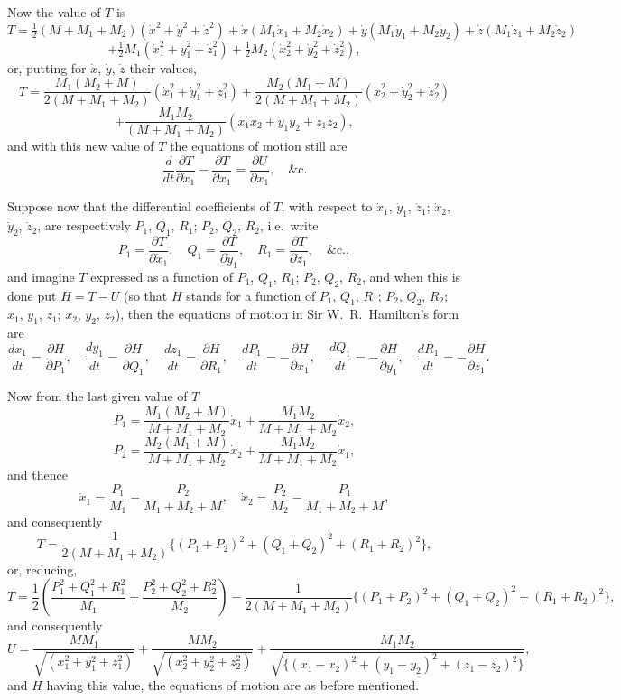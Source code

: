 \documentclass[12pt,a4paper]{article}
\theoremstyle{plain}
\theoremstyle{definition}
\begin{document}
Now the value of $T$ is
\[
T = \tfrac{1}{2}(M + M_1 + M_2)(\dot{x}^2 + \dot{y}^2 + \dot{z}^2) + \dot{x}(M_1\dot{x}_1 + M_2\dot{x}_2) + \dot{y}(M_1\dot{y}_1 + M_2\dot{y}_2) + \dot{z}(M_1\dot{z}_1 + M_2\dot{z}_2)
\]
\[
+ \tfrac{1}{2}M_1(\dot{x}_1^2 + \dot{y}_1^2 + \dot{z}_1^2) + \tfrac{1}{2}M_2(\dot{x}_2^2 + \dot{y}_2^2 + \dot{z}_2^2),
\]
or, putting for $\dot{x}$, $\dot{y}$, $\dot{z}$ their values,
\[
T = \frac{M_1(M_2 + M)}{2(M + M_1 + M_2)}(\dot{x}_1^2 + \dot{y}_1^2 + \dot{z}_1^2) + \frac{M_2(M_1 + M)}{2(M + M_1 + M_2)}(\dot{x}_2^2 + \dot{y}_2^2 + \dot{z}_2^2)
\]
\[
+ \frac{M_1M_2}{(M + M_1 + M_2)}(\dot{x}_1\dot{x}_2 + \dot{y}_1\dot{y}_2 + \dot{z}_1\dot{z}_2),
\]
and with this new value of $T$ the equations of motion still are
\[
\frac{d}{dt} \frac{\partial T}{\partial \dot{x}_1} - \frac{\partial T}{\partial x_1} = \frac{\partial U}{\partial x_1}, \quad \&\text{c.}
\]

\newpage
[181]

Suppose now that the differential coefficients of $T$, with respect to $\dot{x}_1$, $\dot{y}_1$, $\dot{z}_1$; $\dot{x}_2$, $\dot{y}_2$, $\dot{z}_2$, are respectively $P_1$, $Q_1$, $R_1$; $P_2$, $Q_2$, $R_2$, i.e.\ write
\[
P_1 = \frac{\partial T}{\partial \dot{x}_1}, \quad Q_1 = \frac{\partial T}{\partial \dot{y}_1}, \quad R_1 = \frac{\partial T}{\partial \dot{z}_1}, \quad \&\text{c.},
\]
and imagine $T$ expressed as a function of $P_1$, $Q_1$, $R_1$; $P_2$, $Q_2$, $R_2$, and when this is done put $H = T - U$ (so that $H$ stands for a function of $P_1$, $Q_1$, $R_1$; $P_2$, $Q_2$, $R_2$; $x_1$, $y_1$, $z_1$; $x_2$, $y_2$, $z_2$), then the equations of motion in Sir W.~R.~Hamilton's form are
\[
\frac{dx_1}{dt} = \frac{\partial H}{\partial P_1}, \quad
\frac{dy_1}{dt} = \frac{\partial H}{\partial Q_1}, \quad
\frac{dz_1}{dt} = \frac{\partial H}{\partial R_1}, \quad
\frac{dP_1}{dt} = -\frac{\partial H}{\partial x_1}, \quad
\frac{dQ_1}{dt} = -\frac{\partial H}{\partial y_1}, \quad
\frac{dR_1}{dt} = -\frac{\partial H}{\partial z_1}.
\]

Now from the last given value of $T$
\[
P_1 = \frac{M_1(M_2 + M)}{M + M_1 + M_2}\dot{x}_1 + \frac{M_1M_2}{M + M_1 + M_2}\dot{x}_2,
\]
\[
P_2 = \frac{M_2(M_1 + M)}{M + M_1 + M_2}\dot{x}_2 + \frac{M_1M_2}{M + M_1 + M_2}\dot{x}_1,
\]
and thence
\[
\dot{x}_1 = \frac{P_1}{M_1} - \frac{P_2}{M_1 + M_2 + M}, \quad
\dot{x}_2 = \frac{P_2}{M_2} - \frac{P_1}{M_1 + M_2 + M},
\]
and consequently
\[
T = \frac{1}{2(M + M_1 + M_2)}\{(P_1 + P_2)^2 + (Q_1 + Q_2)^2 + (R_1 + R_2)^2\},
\]
or, reducing,
\[
T = \frac{1}{2}\left(\frac{P_1^2 + Q_1^2 + R_1^2}{M_1} + \frac{P_2^2 + Q_2^2 + R_2^2}{M_2}\right) - \frac{1}{2(M + M_1 + M_2)}\{(P_1 + P_2)^2 + (Q_1 + Q_2)^2 + (R_1 + R_2)^2\},
\]
and consequently
\[
U = \frac{MM_1}{\sqrt{(x_1^2 + y_1^2 + z_1^2)}} + \frac{MM_2}{\sqrt{(x_2^2 + y_2^2 + z_2^2)}} + \frac{M_1M_2}{\sqrt{\{(x_1 - x_2)^2 + (y_1 - y_2)^2 + (z_1 - z_2)^2\}}},
\]
and $H$ having this value, the equations of motion are as before mentioned.
\end{document}
